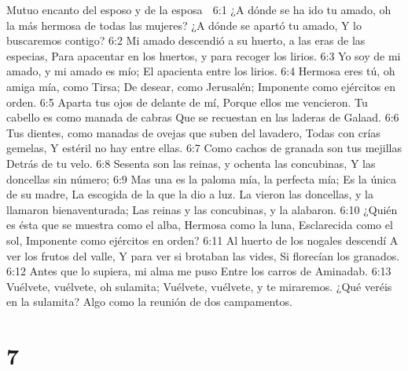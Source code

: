 Mutuo encanto del esposo y de la esposa  

6:1 ¿A dónde se ha ido tu amado, oh la más hermosa de todas las mujeres?  
¿A dónde se apartó tu amado,  
Y lo buscaremos contigo?  
6:2 Mi amado descendió a su huerto, a las eras de las especias,  
Para apacentar en los huertos, y para recoger los lirios.  
6:3 Yo soy de mi amado, y mi amado es mío;  
El apacienta entre los lirios.  
6:4 Hermosa eres tú, oh amiga mía, como Tirsa;  
De desear, como Jerusalén;  
Imponente como ejércitos en orden.  
6:5 Aparta tus ojos de delante de mí,  
Porque ellos me vencieron.  
Tu cabello es como manada de cabras  
Que se recuestan en las laderas de Galaad.  
6:6 Tus dientes, como manadas de ovejas que suben del lavadero,  
Todas con crías gemelas,  
Y estéril no hay entre ellas.  
6:7 Como cachos de granada son tus mejillas  
Detrás de tu velo.  
6:8 Sesenta son las reinas, y ochenta las concubinas,  
Y las doncellas sin número;  
6:9 Mas una es la paloma mía, la perfecta mía;  
Es la única de su madre,  
La escogida de la que la dio a luz.  
La vieron las doncellas, y la llamaron bienaventurada;  
Las reinas y las concubinas, y la alabaron.  
6:10 ¿Quién es ésta que se muestra como el alba,  
Hermosa como la luna,  
Esclarecida como el sol,  
Imponente como ejércitos en orden?  
6:11 Al huerto de los nogales descendí  
A ver los frutos del valle,  
Y para ver si brotaban las vides,  
Si florecían los granados.  
6:12 Antes que lo supiera, mi alma me puso  
Entre los carros de Aminadab.  
6:13 Vuélvete, vuélvete, oh sulamita;  
Vuélvete, vuélvete, y te miraremos.  
¿Qué veréis en la sulamita?  
Algo como la reunión de dos campamentos.  

\chapter{7}

